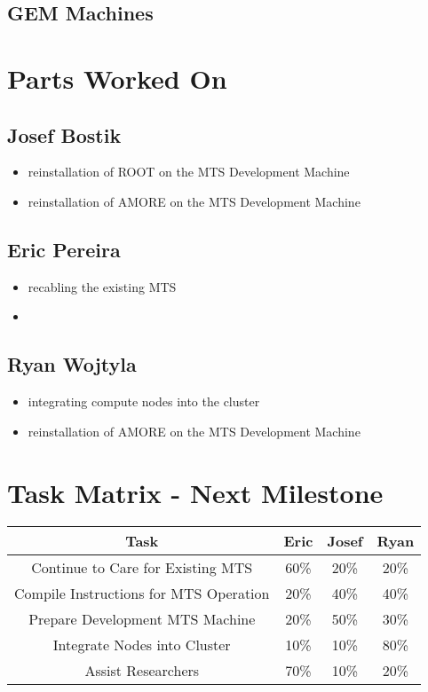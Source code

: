 \documentclass[12pt]{article}
\begin{document}
\subsection{GEM Machines}


\section{Parts Worked On}

\subsection{Josef Bostik}

\begin{itemize}
\item reinstallation of ROOT on the MTS Development Machine
\item reinstallation of AMORE on the MTS Development Machine
\end{itemize}

\subsection{Eric Pereira}

\begin{itemize}
\item recabling the existing MTS
\item %
\end{itemize}

\subsection{Ryan Wojtyla}

\begin{itemize}
\item integrating compute nodes into the cluster
\item reinstallation of AMORE on the MTS Development Machine
\end{itemize}

\section{Task Matrix - Next Milestone}

\begin{center}
  \begin{tabular}{|c|c|c|c|}
    \hline
    Task & Eric & Josef & Ryan \\
    \hline
    Continue to Care for Existing MTS & 60\% & 20\% & 20\% \\
    Compile Instructions for MTS Operation & 20\% & 40\% & 40\% \\
    Prepare Development MTS Machine & 20\% & 50\% & 30\% \\
    Integrate Nodes into Cluster & 10\% & 10\% & 80\% \\
    Assist Researchers & 70\% & 10\% & 20\% \\
    \hline
  \end{tabular}
\end{center}
\end{document}
